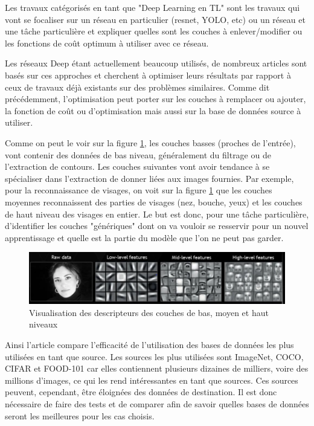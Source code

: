 Les travaux catégorisés en tant que "Deep Learning en TL" sont les travaux qui vont se focaliser sur un réseau en particulier (resnet, YOLO, etc) ou un réseau et une tâche particulière et expliquer quelles sont les couches à enlever/modifier ou les fonctions de coût optimum à utiliser avec ce réseau.

Les réseaux Deep étant actuellement beaucoup utilisés, de nombreux articles \cite{Sun2019ExploringBF, DBLP:journals/corr/abs-1804-06275, 8729686, 7966162} sont basés sur ces approches et cherchent à optimiser leurs résultats par rapport à ceux de travaux déjà existants sur des problèmes similaires. Comme dit précédemment, l'optimisation peut porter sur les couches à remplacer ou ajouter, la fonction de coût ou d'optimisation mais aussi sur la base de données source à utiliser.

Comme on peut le voir sur la figure \ref{fig:features-extract}, les couches basses (proches de l'entrée), vont contenir des données de bas niveau, généralement du filtrage ou de l'extraction de contours. Les couches suivantes vont avoir tendance à se spécialiser dans l'extraction de donner liées aux images fournies. Par exemple, pour la reconnaissance de visages, on voit sur la figure \ref{fig:features-extract} que les couches moyennes reconnaissent des parties de visages (nez, bouche, yeux) et les couches de haut niveau des visages en entier. Le but est donc, pour une tâche particulière, d'identifier les couches "génériques" dont on va vouloir se resservir pour un nouvel apprentissage et quelle est la partie du modèle que l'on ne peut pas garder.

\begin{figure}[!h]
\centering
\includegraphics[scale=0.5]{img/features.png}
\caption{Visualisation des descripteurs des couches de bas, moyen et haut niveaux \cite{featureGFaces}}
\label{fig:features-extract}
\end{figure}

Ainsi l'article \cite{Kornblith_2019_CVPR} compare l'efficacité de l'utilisation des bases de données les plus utilisées en tant que source. Les sources les plus utilisées sont ImageNet, COCO, CIFAR et FOOD-101 car elles contiennent plusieurs dizaines de milliers, voire des millions d'images, ce qui les rend intéressantes en tant que sources. Ces sources peuvent, cependant, être éloignées des données de destination. Il est donc nécessaire de faire des tests et de comparer afin de savoir quelles bases de données seront les meilleures pour les cas choisis.

